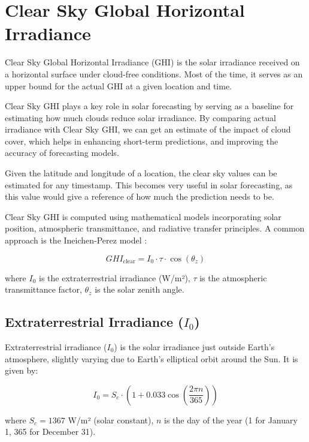 \section{Clear Sky Global Horizontal Irradiance}
\label{sec:appendix_clear_sky_global_horizontal_irradiance}
Clear Sky Global Horizontal Irradiance (GHI) is the solar irradiance received on a horizontal surface under cloud-free conditions. Most of the time, it serves as an upper bound for the actual GHI at a given location and time.

Clear Sky GHI plays a key role in solar forecasting by serving as a baseline for estimating how much clouds reduce solar irradiance. By comparing actual irradiance with Clear Sky GHI, we can get an estimate of the impact of cloud cover, which helps in enhancing short-term predictions, and improving the accuracy of forecasting models.

Given the latitude and longitude of a location, the clear sky values can be estimated for any timestamp. This becomes very useful in solar forecasting, as this value would give a reference of how much the prediction needs to be.

Clear Sky GHI is computed using mathematical models incorporating solar position, atmospheric transmittance, and radiative transfer principles. A common approach is the Ineichen-Perez model \cite{clearsky1}:

\begin{equation}
    GHI_{\text{clear}} = I_0 \cdot \tau \cdot \cos(\theta_z)
\end{equation}

where \( I_0 \) is the extraterrestrial irradiance (W/m²), \( \tau \) is the atmospheric transmittance factor, \( \theta_z \) is the solar zenith angle.


\subsection{Extraterrestrial Irradiance (\( I_0 \))}
\label{subsec:appendix_extraterrestrial_irradiance}
Extraterrestrial irradiance (\( I_0 \)) is the solar irradiance just outside Earth's atmosphere, slightly varying due to Earth's elliptical orbit around the Sun. It is given by:

\begin{equation} 
    I_0 = S_c \cdot \left(1 + 0.033 \cos\left(\frac{2\pi n}{365}\right) \right)
\end{equation}

where \( S_c = 1367 \) W/m² (solar constant), \( n \) is the day of the year (1 for January 1, 365 for December 31).

